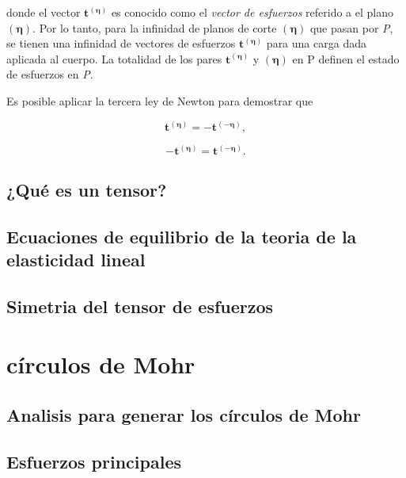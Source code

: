 \documentclass{article}
\begin{document}
    donde el vector $\bm{t^{\bm{(\eta)}}}$ es conocido como el \textit{vector de esfuerzos}
    referido a el plano $\bm{(\eta)}$.
    Por lo tanto, para la infinidad de planos de corte $\bm{(\eta)}$ que pasan por \textit{P},
    se tienen una infinidad de vectores de esfuerzos $\bm{t^{\bm{(\eta)}}}$ para una carga
    dada aplicada al cuerpo. La totalidad de los pares $\bm{t^{\bm{(\eta)}}}$ y $\bm{(\eta)}$
    en P definen el estado de esfuerzos en \textit{P}.

    Es posible aplicar la tercera ley de Newton para demostrar que

    \begin{equation}
        \bm{t^{\bm{(\eta)}}} = - \bm{t^{\bm{(-\eta)}}},
    \end{equation}

    \begin{equation}
        -\bm{t^{\bm{(\eta)}}} = \bm{t^{\bm{(-\eta)}}}.
    \end{equation}

    \subsection{¿Qué es un tensor?}
    \subsection{Ecuaciones de equilibrio de la teoria de la elasticidad lineal}
    \subsection{Simetria del tensor de esfuerzos}
    \section{círculos de Mohr}
    \subsection{Analisis para generar los círculos de Mohr}
    \subsection{Esfuerzos principales}
\end{document}
